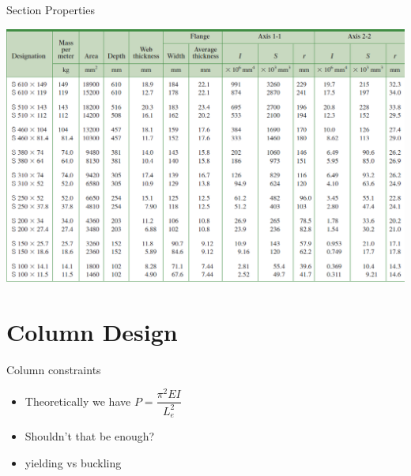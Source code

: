 \documentclass[10pt, svgnames]{beamer}
\begin{document}
\begin{frame}[label={sec:org4f3f464}]{Section Properties}
\begin{center}
\includegraphics[width=.9\linewidth]{./pictures/section-table.png}
\end{center}
\end{frame}

\section{Column Design}
\label{sec:org18a313a}
\begin{frame}[label={sec:org51e962d}]{Column constraints}
\begin{itemize}
\item Theoretically we have \(P = \dfrac{\pi^2 EI}{L_e^2}\)
\item Shouldn't that be enough?
\item yielding vs buckling
\end{itemize}
\end{frame}
\end{document}
